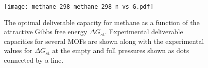 \documentclass{nature}
\newcommand{\xvec}{\mathbf{x}}
\newcommand\V{\Phi}
\begin{document}

\begin{figure}
    \centering
    \texttt{[image: methane-298-methane-298-n-vs-G.pdf]}
    \caption{The optimal deliverable capacity for methane as a function of the attractive Gibbs free energy $\Delta G_{st}$.  Experimental deliverable capacities for several MOFs are shown along with the experimental values for $\Delta G_{st}$ at the empty and full pressures shown as dots connected by a line.}
    \label{fig:methane-298-D}
\end{figure}
\end{document}

